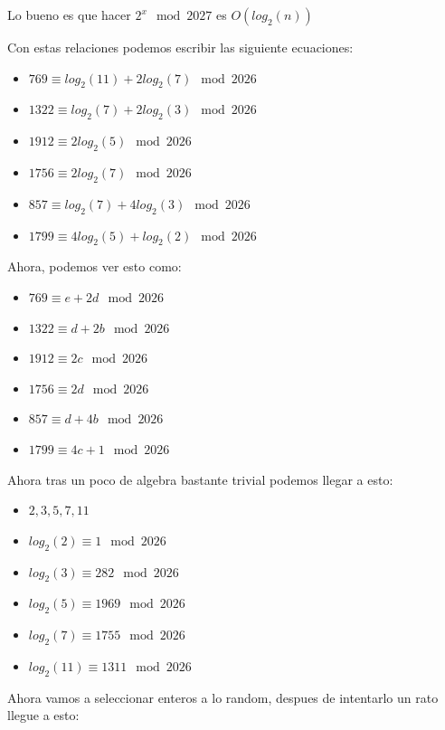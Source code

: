 \documentclass[12pt, fleqn]{report}                             %
\theoremstyle{break}                                            %
\begin{document}
    Lo bueno es que hacer $2^x \mod{2027}$ es $O(log_2(n))$

    Con estas relaciones podemos escribir las siguiente ecuaciones:
    \begin{itemize}
      \item $769 \equiv log_2(11) + 2 log_2(7) \mod{2026}$
      \item $1322 \equiv log_2(7) + 2 log_2(3) \mod{2026}$
      
      \item $1912 \equiv 2log_2(5) \mod{2026}$
      \item $1756 \equiv 2log_2(7) \mod{2026}$

      \item $857 \equiv log_2(7) + 4log_2(3) \mod{2026}$
      \item $1799 \equiv 4log_2(5) + log_2(2) \mod{2026}$
    \end{itemize}

    Ahora, podemos ver esto como:
    \begin{itemize}
      \item $769 \equiv e + 2 d \mod{2026}$
      \item $1322 \equiv d + 2 b \mod{2026}$
      
      \item $1912 \equiv 2c \mod{2026}$
      \item $1756 \equiv 2d \mod{2026}$

      \item $857 \equiv d + 4b \mod{2026}$
      \item $1799 \equiv 4c + 1 \mod{2026}$
    \end{itemize}

    Ahora tras un poco de algebra bastante trivial podemos llegar a esto:
    \begin{itemize}
      \item $2, 3, 5, 7, 11$
      \item $log_2(2) \equiv 1 \mod{2026}$
      \item $log_2(3) \equiv 282 \mod{2026}$
      \item $log_2(5) \equiv 1969 \mod{2026}$
      \item $log_2(7) \equiv 1755 \mod{2026}$
      \item $log_2(11) \equiv 1311 \mod{2026}$
    \end{itemize}

    Ahora vamos a seleccionar enteros a lo random, despues de intentarlo un rato llegue
    a esto:
\end{document}

